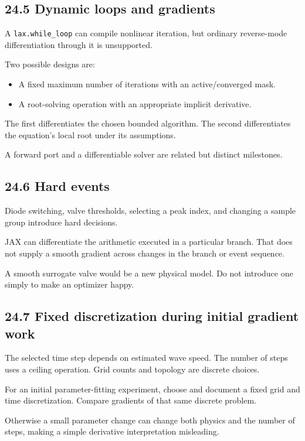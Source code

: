 \documentclass[11pt,a4paper]{article}
\begin{document}
\subsection{24.5 Dynamic loops and gradients}
A \texttt{lax.\allowbreak{}while\_\allowbreak{}loop} can compile nonlinear iteration, but ordinary reverse-mode differentiation through it is unsupported.

Two possible designs are:


\begin{itemize}
\item A fixed maximum number of iterations with an active/converged mask.


\item A root-solving operation with an appropriate implicit derivative.


\end{itemize}
The first differentiates the chosen bounded algorithm. The second differentiates the equation's local root under its assumptions.

A forward port and a differentiable solver are related but distinct milestones.

\subsection{24.6 Hard events}
Diode switching, valve thresholds, selecting a peak index, and changing a sample group introduce hard decisions.

JAX can differentiate the arithmetic executed in a particular branch. That does not supply a smooth gradient across changes in the branch or event sequence.

A smooth surrogate valve would be a new physical model. Do not introduce one simply to make an optimizer happy.

\subsection{24.7 Fixed discretization during initial gradient work}
The selected time step depends on estimated wave speed. The number of steps uses a ceiling operation. Grid counts and topology are discrete choices.

For an initial parameter-fitting experiment, choose and document a fixed grid and time discretization. Compare gradients of that same discrete problem.

Otherwise a small parameter change can change both physics and the number of steps, making a simple derivative interpretation misleading.
\end{document}
